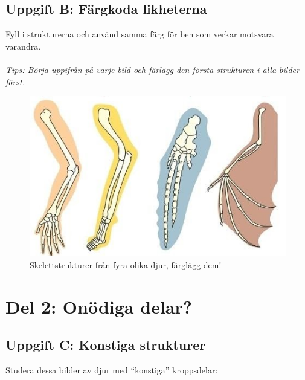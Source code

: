 \documentclass[a4paper,11pt]{article}
\begin{document}
\newpage
\subsection{Uppgift B: Färgkoda likheterna}

Fyll i strukturerna och använd samma färg för ben som verkar motsvara varandra.
\\ \\ \textit{Tips: Börja uppifrån på varje bild och färlägg den första strukturen i alla bilder först.}
\begin{figure}[H]
    \centering
    \includegraphics[width=1\textwidth]{homologous-organs.png}
    \caption{Skelettstrukturer från fyra olika djur, färglägg dem!}
    \end{figure}
\newpage

\section{Del 2: Onödiga delar?}

\subsection{Uppgift C: Konstiga strukturer}

Studera dessa bilder av djur med ``konstiga'' kroppsdelar:
\end{document}
